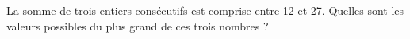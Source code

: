 
La somme de trois entiers consécutifs est comprise entre 12 et 27. 
Quelles sont les valeurs possibles du plus grand de ces trois nombres ? 